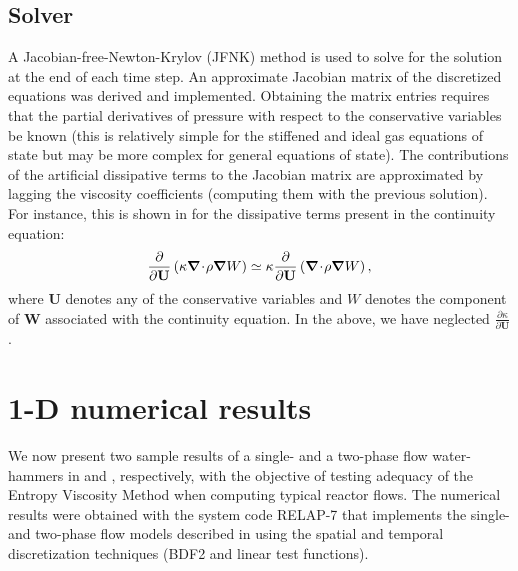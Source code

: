 \documentclass{mc2015}
\begin{document}
\subsection{Solver} \label{sec:solver}
%
A Jacobian-free-Newton-Krylov (JFNK) method is used to solve for the solution at the end of each time step. 
An approximate Jacobian matrix of the discretized equations was derived and implemented. Obtaining the 
matrix entries requires that the partial derivatives of pressure with respect to the conservative variables 
be known (this is relatively simple for the stiffened and ideal gas equations of state but may be more 
complex for general equations of state). The contributions of the artificial dissipative terms to the 
Jacobian matrix are approximated by lagging the viscosity coefficients (computing them with the previous solution). 
For instance, this is shown in  for the dissipative terms present in the continuity equation:
\begin{equation}
\label{eq:jac_diss_term}
\frac{\partial}{\partial \mathbf U} \left( \kappa \boldsymbol\nabla\! \cdot \! \rho \boldsymbol\nabla W \right) \simeq \kappa \frac{\partial}{\partial \mathbf U} \left( \boldsymbol\nabla\! \cdot \! \rho \boldsymbol\nabla W \right),
\end{equation}  
where $\mathbf  U$ denotes any of the conservative variables and $W$ denotes the component of $\mathbf  W$ associated with the 
continuity equation. In the above, we have neglected $\frac{\partial \kappa}{\partial \mathbf U}$.
%
\section{1-D numerical results}\label{sec:results}
%
We now present two sample results of a single- and a two-phase flow water-hammers in  and , respectively, with the objective of testing adequacy of the Entropy Viscosity Method when computing typical reactor flows. The numerical results were obtained with the system code RELAP-7 that implements the single- and two-phase flow models described in  using the spatial and temporal discretization techniques  (BDF2 and linear test functions).
\end{document}
